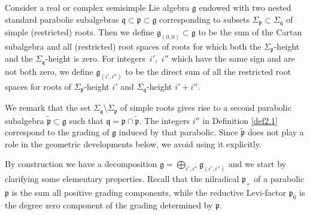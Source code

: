 \documentclass[10pt,a4paper]{amsart}
\numberwithin{equation}{section}
\def\frak{\mathfrak}
\newcommand{\Si}{\Sigma}
\begin{document}
\begin{Definition}\label{def2.1}
 Consider a real or complex semisimple Lie algebra $\frak g$ endowed with two nested
 standard parabolic subalgebras $\frak q\subset\frak p\subset\frak g$ corresponding
 to subsets $\Si_{\frak p}\subset\Si_{\frak q}$ of simple (restricted) roots. Then
 we define $\frak g_{(0,0)}\subset\frak g$ to be the sum of the Cartan subalgebra
 and all (restricted) root spaces of roots for which both the $\Si_{\frak p}$-height
 and the $\Si_{\frak q}$-height is zero. For integers~$i'$,~$i''$ which have the same
 sign and are not both zero, we define $\frak g_{(i',i'')}$ to be the direct sum of
 all the restricted root spaces for roots of $\Si_{\frak p}$-height $i'$ and
 $\Si_{\frak q}$-height $i'+i''$.
\end{Definition}

We remark that the set $\Si_{\frak q}\setminus\Si_{\frak p}$ of simple roots gives
rise to a second parabolic subalgebra $\tilde{\frak p}\subset\frak g$ such that
$\frak q=\frak p\cap\tilde{\frak p}$. The integers $i''$ in Definition \ref{def2.1}
correspond to the grading of $\frak g$ induced by that parabolic. Since $\tilde{\frak
 p}$ does not play a role in the geometric developments below, we avoid using it
explicitly.

By construction we have a decomposition $\frak g=\bigoplus_{i',i''}\frak g_{(i',i'')}$
and we start by clarifying some elementary properties. Recall that the nilradical
$\frak p_+$ of a parabolic $\frak p$ is the sum all positive grading components,
while the reductive Levi-factor $\frak p_0$ is the degree zero component of the
grading determined by $\frak p$.
\end{document}
